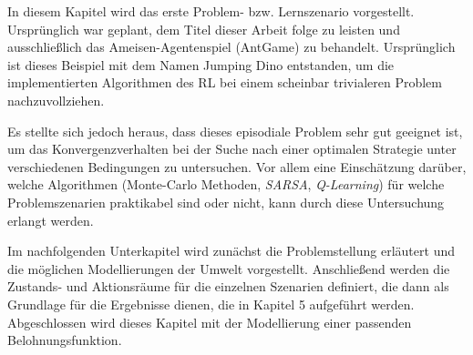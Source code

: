 In diesem Kapitel wird das erste Problem- bzw. Lernszenario vorgestellt. Ursprünglich war geplant, dem Titel dieser Arbeit folge zu leisten und ausschließlich das Ameisen-Agentenspiel (\glqq AntGame\grqq{}) zu behandelt. Ursprünglich ist dieses Beispiel mit dem Namen \glqq Jumping Dino\grqq{} entstanden, um die implementierten Algorithmen des RL bei einem scheinbar trivialeren Problem nachzuvollziehen.
\par 
Es stellte sich jedoch heraus, dass dieses episodiale Problem sehr gut geeignet ist, um das Konvergenzverhalten bei der Suche nach einer optimalen Strategie unter verschiedenen Bedingungen zu untersuchen. Vor allem eine Einschätzung darüber, welche Algorithmen (Monte-Carlo Methoden, \textit{SARSA}, \textit{Q-Learning}) für welche Problemszenarien praktikabel sind oder nicht, kann durch diese Untersuchung erlangt werden. 
\par 
Im nachfolgenden Unterkapitel wird zunächst die Problemstellung erläutert und die möglichen Modellierungen der Umwelt vorgestellt. Anschließend werden die Zustands- und Aktionsräume für die einzelnen Szenarien definiert, die dann als Grundlage für die Ergebnisse dienen, die in Kapitel 5 aufgeführt werden. Abgeschlossen wird dieses Kapitel mit der Modellierung einer passenden Belohnungsfunktion.

